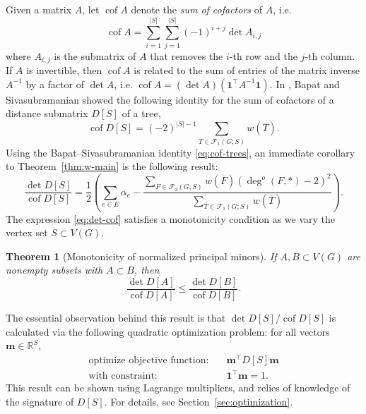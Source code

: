 \documentclass{amsart}
\newtheorem{thm}{Theorem}
\newtheorem{prop}[thm]{Proposition}
\theoremstyle{definition}
\newcommand{\RR}{\mathbb{R}}
\newcommand{\bone}{\mathbf{1}}
\newcommand{\boldm}{\mathbf{m}}
\newcommand{\tr}{\intercal}
\DeclareMathOperator{\cof}{cof}
\newcommand{\trees}{\mathcal{F}_1}
\newcommand{\forests}{\mathcal{F}}
\newcommand{\degout}{\deg^o}
\begin{document}
Given a matrix $A$, let $\cof A$ denote the {\em sum of cofactors} of $A$, i.e. 
\[
	\cof A = \sum_{i = 1}^{|S|} \sum_{j = 1}^{|S|} (-1)^{i + j} \det A_{i,j} 
\]
where $A_{i,j}$ is the submatrix of $A$ that removes the $i$-th row and the $j$-th column.
If $A$ is invertible, then $\cof A$ is related to the sum of entries of the matrix inverse $A^{-1}$ by a factor of $\det A$, i.e. $\cof A = (\det A) (\bone^\tr A^{-1} \bone)$.
In \cite{bapat-sivasubramanian}, Bapat and Sivasubramanian showed the following identity for 
the sum of cofactors of a distance submatrix $D[S]$ of a tree,
\begin{equation}\label{eq:cof-trees}
	\cof D[S] = (-2)^{|S| - 1} \sum_{T \in \trees(G;S)} w(\overline{T}) .
\end{equation}
Using the Bapat--Sivasubramanian identity \eqref{eq:cof-trees}, an immediate corollary to Theorem~\ref{thm:w-main} is the following result:
\begin{equation}
\label{eq:det-cof}
	\frac{\det D[S]}{\cof D[S]} = \frac12 \left( \sum_{e \in E} \alpha_e - \frac{\sum_{F \in \forests_2(G; S)} w(\overline{F}) (\degout(F,*) - 2)^2}{\sum_{T \in \trees(G; S)} w(\overline{T})} \right).
\end{equation}
The expression \eqref{eq:det-cof} satisfies a monotonicity condition as we vary the vertex set $S \subset V(G)$.

\begin{thm}[Monotonicity of normalized principal minors]
\label{thm:monotonic}
If $A,B \subset V(G)$
are nonempty subsets with
$A \subset B$,
then
\begin{equation*}
	\frac{\det D[A]}{\cof D[A]}  \leq \frac{\det D[B]}{\cof D[B]}.
\end{equation*}
\end{thm}
The essential observation behind this result is that $\det D[S] / \cof D[S]$ is calculated via the following quadratic optimization problem: for all vectors $ \boldm \in \RR^S$,
\begin{align}
	\text{optimize objective function:} &\quad \boldm^\tr D[S] \boldm \\
	\text{with constraint:} &\quad \bone^\tr \boldm = 1.
\end{align}
This result can be shown using Lagrange multipliers,
and relies of knowledge of the signature of $D[S]$.
For details, see Section~\ref{sec:optimization}.
\end{document}
